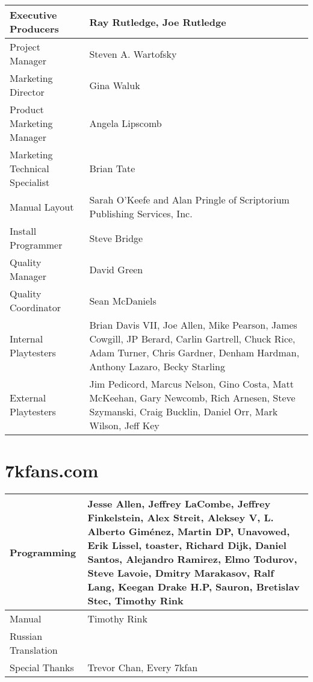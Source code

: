 \begin{tabular}{ | p{4cm} | p{9cm} |}
	\hline
	Executive Producers	& Ray Rutledge, Joe Rutledge \\ \hline
Project Manager	& Steven A. Wartofsky \\ \hline
Marketing Director	& Gina Waluk \\ \hline
Product Marketing Manager	& Angela Lipscomb \\ \hline
Marketing Technical Specialist	& Brian Tate \\ \hline
Manual Layout	& Sarah O’Keefe and Alan Pringle of Scriptorium Publishing Services, Inc. \\ \hline
Install Programmer	& Steve Bridge \\ \hline
Quality Manager	& David Green \\ \hline
Quality Coordinator	& Sean McDaniels \\ \hline
Internal Playtesters	& Brian Davis VII, Joe Allen, Mike Pearson, James Cowgill, JP Berard, Carlin Gartrell, Chuck Rice, Adam Turner, Chris Gardner, Denham Hardman, Anthony Lazaro, Becky Starling \\ \hline
External Playtesters	& Jim Pedicord, Marcus Nelson, Gino Costa, Matt McKeehan, Gary Newcomb, Rich Arnesen, Steve Szymanski, Craig Bucklin, Daniel Orr, Mark Wilson, Jeff Key \\ \hline
	\hline
\end{tabular}

\section{7kfans.com}

\begin{tabular}{ | p{4cm} | p{9cm} |}
	\hline
	Programming	& Jesse Allen, Jeffrey LaCombe, Jeffrey Finkelstein, Alex Streit, Aleksey V, L. Alberto Giménez, Martin DP, Unavowed, Erik Lissel, toaster, Richard Dijk, Daniel Santos, Alejandro Ramirez, Elmo Todurov, Steve Lavoie, Dmitry Marakasov, Ralf Lang, Keegan Drake H.P, Sauron, Bretislav Stec, Timothy Rink \\ \hline
Manual	& Timothy Rink \\ \hline
Russian Translation	& \\ \hline
Special Thanks	& Trevor Chan, Every 7kfan \\ \hline
	\hline
\end{tabular}